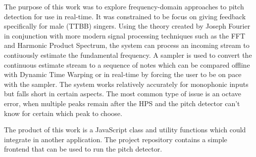 The purpose of this work was to explore frequency-domain approaches to pitch detection for use in real-time. It was constrained to be focus on giving feedback specifically for male (TTBB) singers. Using the theory created by Joseph Fourier in conjunction with more modern signal processing techniques such as the FFT and Harmonic Product Spectrum, the system can process an incoming stream to contiuously estimate the fundamental frequency. A sampler is used to convert the continuous estimate stream to a sequence of notes which can be compared offline with Dynamic Time Warping or in real-time by forcing the user to be on pace with the sampler. The system works relatively accurately for monophonic inputs but falls short in certain aspects. The most common type of issue is an octave error, when multiple peaks remain after the HPS and the pitch detector can't know for certain which peak to choose.

The product of this work is a JavaScript class and utility functions which could integrate in another application. The project repository contains a simple frontend that can be used to run the pitch detector.  
